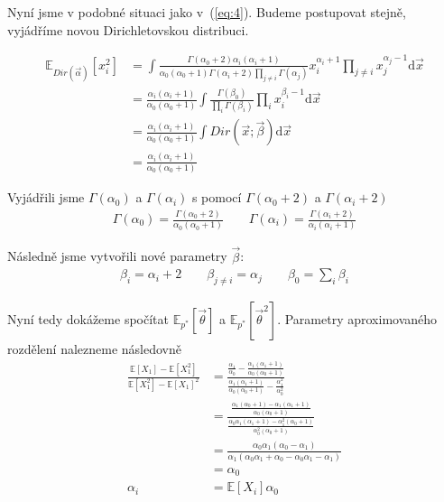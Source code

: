 Nyní jsme v podobné situaci jako v~(\ref{eq:4}). Budeme postupovat stejně,
vyjádříme novou Dirichletovskou distribuci.

\begin{align}
\mathbb{E}_{Dir(\vec\alpha)}[x_i^2] &=
\int \frac{\Gamma(\alpha_0 + 2) \alpha_i (\alpha_i + 1)}
		{\alpha_0 (\alpha_0 + 1) \Gamma(\alpha_i + 2) \prod_{j \ne i} \Gamma(\alpha_j)}
    x_i^{\alpha_i + 1} \prod_{j \ne i} x_j^{\alpha_j - 1}
\mathrm{d}\vec x
\\
&= \frac{\alpha_i (\alpha_i + 1)}
		{\alpha_0 (\alpha_0 + 1)}
	\int \frac{\Gamma(\beta_0)}
		{\prod_i \Gamma(\beta_i)}
        \prod_i x_i^{\beta_i - 1} 
    \mathrm{d}\vec x
\\
&= \frac{\alpha_i (\alpha_i + 1)}
		{\alpha_0 (\alpha_0 + 1)}
	\int Dir(\vec x; \vec\beta)
    \mathrm{d}\vec x
\\
&= \frac{\alpha_i (\alpha_i + 1)}
		{\alpha_0 (\alpha_0 + 1)}
\end{align}

Vyjádřili jsme $\Gamma(\alpha_0)$ a $\Gamma(\alpha_i)$ s pomocí $\Gamma(\alpha_0 + 2)$ a $\Gamma(\alpha_i + 2)$
\begin{align}
\Gamma(\alpha_0) = \frac{\Gamma(\alpha_0 + 2)}
				{\alpha_0(\alpha_0 + 1)}
\quad \quad
\Gamma(\alpha_i) = \frac{\Gamma(\alpha_i + 2)}
				{\alpha_i(\alpha_i + 1)}
\end{align}

Následně jsme vytvořili nové parametry $\vec\beta$:
\begin{align}
\beta_i = \alpha_i + 2 \quad \quad
\beta_{j \ne i} = \alpha_j \quad \quad
\beta_0 = \sum_i \beta_i
\end{align}

Nyní tedy dokážeme spočítat $\mathbb{E}_{p^*}[\vec\theta]$ a $\mathbb{E}_{p^*}[\vec\theta^2]$.
Parametry aproximovaného rozdělení nalezneme následovně
\begin{align}
\frac{\mathbb{E}[X_1] - \mathbb{E}[X_1^2]}
     {\mathbb{E}[X_1^2] - \mathbb{E}[X_1]^2} &=
\frac{
	\frac{\alpha_1}
		{\alpha_0}
	- \frac{\alpha_1(\alpha_1 + 1)}
		{\alpha_0(\alpha_0 + 1)}
	}
	{
	\frac{\alpha_1(\alpha_1 + 1)}
		{\alpha_0(\alpha_0 + 1)}
	- \frac{\alpha_1^2}
		{\alpha_0^2}
	}
\label{eq:5}
\\
&=
\frac{
    \frac{\alpha_1 (\alpha_0 + 1) - \alpha_1(\alpha_1 + 1)}
         {\alpha_0 (\alpha_0 + 1)}
}{
    \frac{\alpha_0 \alpha_1 (\alpha_1 + 1) - \alpha_1^2 (\alpha_0 + 1)}
         {\alpha_0^2 (\alpha_0 + 1)}
}
\\
&=
\frac{\alpha_0 \alpha_1 (\alpha_0 - \alpha_1)}
     {\alpha_1 (\alpha_0 \alpha_1 + \alpha_0 - \alpha_0 \alpha_1 - \alpha_1)}
\\
&=
\alpha_0
\\
\alpha_i &= \mathbb{E}[X_i] \alpha_0 \label{eq:6}
\end{align}

